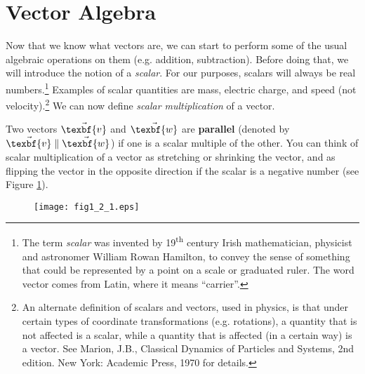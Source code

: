 \section{Vector Algebra}
Now that we know what vectors are, we can start to perform some of the usual algebraic operations on them (e.g.
addition, subtraction). Before doing that, we will introduce the notion of a \emph{scalar}.
For our purposes, scalars will always be real numbers.\footnote{The term \emph{scalar} was invented by
19\textsuperscript{th} century
Irish mathematician, physicist and astronomer William Rowan Hamilton, to convey the sense of something
that could be represented by a point
on a scale or graduated ruler. The word vector comes from Latin, where it means ``carrier''.} Examples of
scalar quantities are mass, electric charge, and speed (not velocity).\footnote{An alternate definition of
scalars and vectors, used in physics, is that under certain types of coordinate transformations (e.g. rotations), a
quantity that is not affected is a scalar, while a quantity that is affected (in a certain way) is a vector.
See Marion, J.B., Classical Dynamics of Particles and Systems, 2nd edition. New York: Academic
Press, 1970 for details.}
We can now define \emph{scalar multiplication} of a vector.


Two vectors $\vec{\texbf{v}}$ and $\vec{\texbf{w}}$ are \textbf{parallel} (denoted by $\vec{\texbf{v}} \parallel
\vec{\texbf{w}}$) if one is a scalar multiple of the other.
You can think of scalar multiplication of a vector as stretching or shrinking
the vector, and as flipping the vector in the opposite direction if the scalar is a negative number
(see Figure \ref{fig:scalar}).

\begin{figure}[h]
 \begin{center}
  \texttt{[image: fig1\_2\_1.eps]}\vspace{-3mm}
 \end{center}
 \caption[]{}
 \label{fig:scalar}
\end{figure}\vspace{-2mm}

